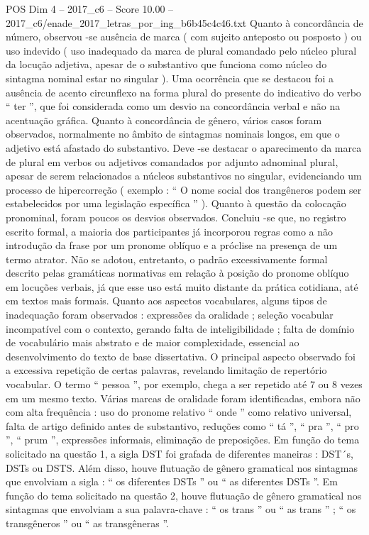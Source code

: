 \begin{textsample}{POS Dim 4 – 2017\_c6 – Score 10.00 – 2017\_c6/enade\_2017\_letras\_por\_ing\_b6b45c4c46.txt}
Quanto à concordância de número, observou -se ausência de marca ( com sujeito anteposto ou posposto ) ou uso indevido ( uso inadequado da marca de plural comandado pelo núcleo plural da locução adjetiva, apesar de o substantivo que funciona como núcleo do sintagma nominal estar no singular ).
Uma ocorrência que se destacou foi a ausência de acento circunflexo na forma plural do presente do indicativo do verbo “ ter ”, que foi considerada como um desvio na concordância verbal e não na acentuação gráfica.
Quanto à concordância de gênero, vários casos foram observados, normalmente no âmbito de sintagmas nominais longos, em que o adjetivo está afastado do substantivo.
Deve -se destacar o aparecimento da marca de plural em verbos ou adjetivos comandados por adjunto adnominal plural, apesar de serem relacionados a núcleos substantivos no singular, evidenciando um processo de hipercorreção ( exemplo : “ O nome social dos trangêneros podem ser estabelecidos por uma legislação específica ” ).
Quanto à questão da colocação pronominal, foram poucos os desvios observados.
Concluiu -se que, no registro escrito formal, a maioria dos participantes já incorporou regras como a não introdução da frase por um pronome oblíquo e a próclise na presença de um termo atrator.
Não se adotou, entretanto, o padrão excessivamente formal descrito pelas gramáticas normativas em relação à posição do pronome oblíquo em locuções verbais, já que esse uso está muito distante da prática cotidiana, até em textos mais formais.
Quanto aos aspectos vocabulares, alguns tipos de inadequação foram observados : expressões da oralidade ; seleção vocabular incompatível com o contexto, gerando falta de inteligibilidade ; falta de domínio de vocabulário mais abstrato e de maior complexidade, essencial ao desenvolvimento do texto de base dissertativa.
O principal aspecto observado foi a excessiva repetição de certas palavras, revelando limitação de repertório vocabular.
O termo “ pessoa ”, por exemplo, chega a ser repetido até 7 ou 8 vezes em um mesmo texto.
Várias marcas de oralidade foram identificadas, embora não com alta frequência : uso do pronome relativo “ onde ” como relativo universal, falta de artigo definido antes de substantivo, reduções como “ tá ”, “ pra ”, “ pro ”, “ prum ”, expressões informais, eliminação de preposições.
Em função do tema solicitado na questão 1, a sigla DST foi grafada de diferentes maneiras : DST´s, DSTs ou DSTS.
Além disso, houve flutuação de gênero gramatical nos sintagmas que envolviam a sigla : “ os diferentes DSTs ” ou “ as diferentes DSTs ”.
Em função do tema solicitado na questão 2, houve flutuação de gênero gramatical nos sintagmas que envolviam a sua palavra-chave : “ os trans ” ou “ as trans ” ; “ os transgêneros ” ou “ as transgêneras ”.

\end{textsample}
